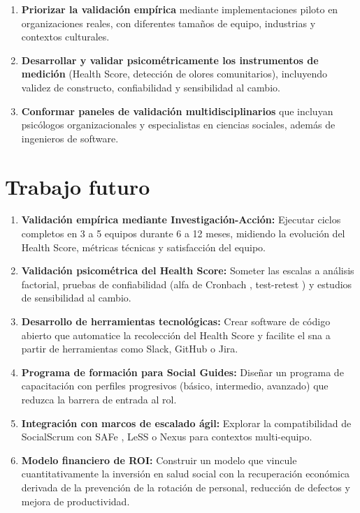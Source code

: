 \begin{enumerate}
    \item \textbf{Priorizar la validación empírica} mediante implementaciones piloto en organizaciones reales, con diferentes tamaños de equipo, industrias y contextos culturales.

    \item \textbf{Desarrollar y validar psicométricamente los instrumentos de medición} (Health Score, detección de olores comunitarios), incluyendo validez de constructo, confiabilidad y sensibilidad al cambio.

    \item \textbf{Conformar paneles de validación multidisciplinarios} que incluyan psicólogos organizacionales y especialistas en ciencias sociales, además de ingenieros de software.
\end{enumerate}

\section{Trabajo futuro}
\label{sec:trabajos-futuros}

\begin{enumerate}
    \item \textbf{Validación empírica mediante Investigación-Acción:} Ejecutar ciclos completos \cite{baskerville1999actionresearch} en 3 a 5 equipos durante 6 a 12 meses, midiendo la evolución del Health Score, métricas técnicas y satisfacción del equipo.

    \item \textbf{Validación psicométrica del Health Score:} Someter las escalas a análisis factorial, pruebas de confiabilidad (alfa de Cronbach \cite{cronbach1951coefficient}, test-retest \cite{nunnally1994psychometric}) y estudios de sensibilidad al cambio.

    \item \textbf{Desarrollo de herramientas tecnológicas:} Crear software de código abierto que automatice la recolección del Health Score y facilite el \gls{sna} a partir de herramientas como Slack, GitHub o Jira.

    \item \textbf{Programa de formación para Social Guides:} Diseñar un programa de capacitación con perfiles progresivos (básico, intermedio, avanzado) que reduzca la barrera de entrada al rol.

    \item \textbf{Integración con marcos de escalado ágil:} Explorar la compatibilidad de SocialScrum con SAFe \cite{SafeFramework}, LeSS \cite{larman2016less} o Nexus \cite{nexusguide} para contextos multi-equipo.

    \item \textbf{Modelo financiero de ROI:} Construir un modelo que vincule cuantitativamente la inversión en salud social con la recuperación económica derivada de la prevención de la rotación de personal, reducción de defectos y mejora de productividad.
\end{enumerate}

